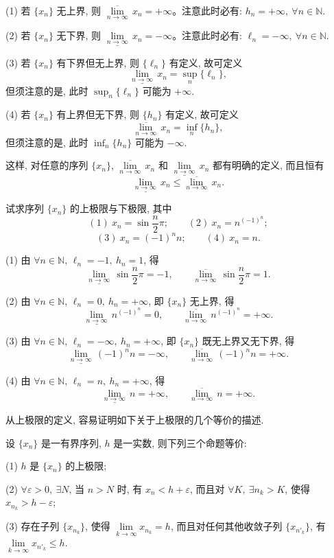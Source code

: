 (1) 若 $\{x_n\}$ 无上界, 则 $\overline{\lim\limits_{n\to\infty}}\,x_n=+\infty$。注意此时必有: $h_n=+\infty,\ \forall n\in\mathbb{N}$.

(2) 若 $\{x_n\}$ 无下界, 则 $\underline{\lim\limits_{n\to\infty}}\,x_n=-\infty$。注意此时必有: $\ell_n=-\infty,\ \forall n\in\mathbb{N}$.

(3) 若 $\{x_n\}$ 有下界但无上界, 则 $\{\ell_n\}$ 有定义, 故可定义
\[
  \underline{\lim_{n\to\infty}}\,x_n=\sup_n\{\ell_n\},
\]
但须注意的是, 此时 $\sup_n\{\ell_n\}$ 可能为 $+\infty$.

(4) 若 $\{x_n\}$ 有上界但无下界, 则 $\{h_n\}$ 有定义, 故可定义
\[
  \overline{\lim_{n\to\infty}}\,x_n=\inf_n\{h_n\},
\]
但须注意的是, 此时 $\inf_n\{h_n\}$ 可能为 $-\infty$.

这样, 对任意的序列 $\{x_n\}$, $\overline{\lim\limits_{n\to\infty}}\,x_n$ 和 $\underline{\lim\limits_{n\to\infty}}\,x_n$ 都有明确的定义, 而且恒有
\[
  \underline{\lim_{n\to\infty}}\,x_n
  \leqslant
  \overline{\lim_{n\to\infty}}\,x_n.
\]

\begin{example}\label{example:ma-2-5-1}
试求序列 $\{x_n\}$ 的上极限与下极限, 其中
\[
  (1)\ x_n=\sin\frac n2\pi;\qquad
  (2)\ x_n=n^{(-1)^n};
\]
\[
  (3)\ x_n=(-1)^n n;\qquad
  (4)\ x_n=n.
\]
\end{example}


\begin{solve}
(1) 由 $\forall n\in\mathbb{N}$, $\ell_n=-1,\ h_n=1$, 得
\[
  \underline{\lim_{n\to\infty}}\,\sin\frac n2\pi=-1,
  \qquad
  \overline{\lim_{n\to\infty}}\,\sin\frac n2\pi=1.
\]

(2) 由 $\forall n\in\mathbb{N}$, $\ell_n=0,\ h_n=+\infty$, 即 $\{x_n\}$ 无上界, 得
\[
  \underline{\lim_{n\to\infty}}\, n^{(-1)^n}=0,
  \qquad
  \overline{\lim_{n\to\infty}}\, n^{(-1)^n}=+\infty.
\]

(3) 由 $\forall n\in\mathbb{N}$, $\ell_n=-\infty,\ h_n=+\infty$, 即 $\{x_n\}$ 既无上界又无下界, 得
\[
  \underline{\lim_{n\to\infty}}\,(-1)^n n=-\infty,
  \qquad
  \overline{\lim_{n\to\infty}}\,(-1)^n n=+\infty.
\]

(4) 由 $\forall n\in\mathbb{N}$, $\ell_n=n,\ h_n=+\infty$, 得
\[
  \underline{\lim_{n\to\infty}}\, n=+\infty,
  \qquad
  \overline{\lim_{n\to\infty}}\, n=+\infty.
\]

从上极限的定义, 容易证明如下关于上极限的几个等价的描述.
\end{solve}


\begin{theorem}\label{theorem:ma-2-5-1}
设 $\{x_n\}$ 是一有界序列, $h$ 是一实数, 则下列三个命题等价:

(1) $h$ 是 $\{x_n\}$ 的上极限;

(2) $\forall\varepsilon>0,\ \exists N$, 当 $n>N$ 时, 有 $x_n<h+\varepsilon$, 而且对 $\forall K,\ \exists n_k>K$, 使得 $x_{n_k}>h-\varepsilon$;

(3) 存在子列 $\{x_{n_k}\}$, 使得 $\lim\limits_{k\to\infty}x_{n_k}=h$, 而且对任何其他收敛子列 $\{x_{n'_k}\}$, 有 $\lim\limits_{k\to\infty}x_{n'_k}\leqslant h$.
\end{theorem}


